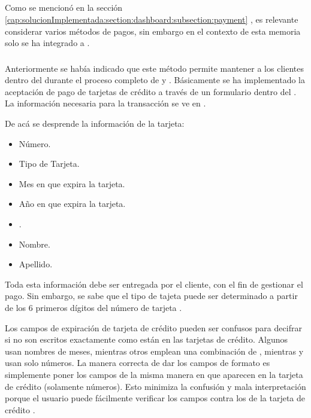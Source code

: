 \subsection{\paymentsCOM}\label{chapter:solucionimplementada:section:payment}
	
	Como se mencionó en la sección \ref{cap:solucionImplementada:section:dashboard:subsection:payment} , es relevante considerar varios métodos de pagos, sin embargo en el contexto de esta memoria solo se ha integrado a \PPPaymentProNAME.


	\subsubsection{\PPPaymentProNAME}
		Anteriormente se había indicado que este método permite mantener a los clientes dentro del \websiteINT durante el proceso completo de \paymentsCOM y \checkoutCOM. Básicamente se ha implementado la aceptación de pago de tarjetas de crédito a través de un formulario dentro del \websiteINT. La información necesaria para la transacción se ve en .

		

		De acá se desprende la información de la tarjeta:

		\begin{itemize}
			\item Número.
			\item Tipo de Tarjeta.
			\item Mes en que expira la tarjeta.
			\item Año en que expira la tarjeta.
			\item \cvvTWOCOM.
			\item Nombre.
			\item Apellido.
		\end{itemize} 

		Toda esta información debe ser entregada por el cliente, con el fin de gestionar el pago. Sin embargo, se sabe que el tipo de tajeta puede ser determinado a partir de los 6 primeros dígitos del número de tarjeta \cite{online_investopedia_meaning_IIN}. 

		Los campos de expiración de tarjeta de crédito pueden ser confusos para decifrar si no son escritos exactamente como están en las tarjetas de crédito. Algunos \websitesINT usan nombres de meses, mientras otros emplean una combinación de \nombreNumeroCPT, mientras y usan solo números. La manera correcta de dar los campos de formato es simplemente poner los campos de la misma manera en que aparecen en la tarjeta de crédito (solamente números). Esto minimiza la confusión y mala interpretación porque el usuario puede fácilmente verificar  los campos contra los de la tarjeta de crédito \cite{online_official_smashingmagazine_fundamental_guidelines_checkout_design}.

